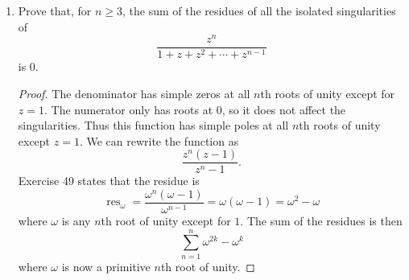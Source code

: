 \documentclass[10pt]{article}
\newcommand{\Z}{\mathbb{Z}}
\DeclareMathOperator*{\res}{res}
\begin{document}
\begin{enumerate}
\begin{proof}
Therefore, in the quotient $\dfrac{f'}{f}$, all but one copy of each pole of $f'$ is reduced to a removable singularity, and all but one copy of each zero of $f$ is reduced to a removable singularity.  Thus, the poles of $\dfrac{f'}{f}$ are all simple, and they are precisely the poles and zeros of $f$.

Now, suppose $z_0$ is a pole of $f$ of order $N$.  Then $f(z) = (z - z_0)^{-N}h(z)$ for some $h$ that is holomorphic and nonzero in a neighborhood of $z_0$.  This gives $f'(z) = -N(z-z_0)^{-N-1}h(z) + (z-z_0)^{-N}h'(z)$.  Also, $z_0$ is a simple pole of $\dfrac{f'}{f}$, so its residue is given by
\begin{align*}
\res\nolimits_{z_0} \frac{f'(z)}{f(z)} &= \lim_{z \rightarrow z_0} (z-z_0)\frac{f'(z)}{f(z)}
\\
&=
\lim_{z \rightarrow z_0} (z-z_0)\frac{-N(z-z_0)^{-N-1}h(z) + (z-z_0)^{-N}h'(z)}{(z - z_0)^{-N}h(z)}
\\
&=
\lim_{z \rightarrow z_0} \frac{-Nh(z) + (z-z_0)h'(z)}{h(z)}
\\
&=
\frac{-Nh(z_0)}{h(z_0)}
\\
&= -N \in \Z.
\end{align*}
If $z_0$ is a zero of $f$ of order $M$, then $f(z) = (z - z_0)^M h(z)$ for a function $h$ that is holomorphic and nonzero in a neighborhood of $z_0$.  Now, $f'(z) = M(z-z_0)^{M-1}h(z) + (z-z_0)^{M}h'(z)$.   Again, $z_0$ is a simple pole of $\frac{f'}{f}$.  Substituting $-N = M$ in the algebraic proof directly above, we see that the exact result still follows, and we obtain
$$
\res\nolimits_{z_0} \frac{f'(z)}{f(z)} = M \in \Z.
$$
So, in all cases, the residue is an integer.
\end{proof}

\item Prove that, for $n \geq 3$, the sum of the residues of all the isolated singularities of
$$
\frac{z^n}{1 + z + z^2 + \cdots + z^{n-1}}
$$
is 0.

\begin{proof}
The denominator has simple zeros at all $n$th roots of unity except for $z = 1$.  The numerator only has roots at $0$, so it does not affect the singularities.  Thus this function has simple poles at all $n$th roots of unity except $z = 1$.
We can rewrite the function as
$$
\frac{z^n(z-1)}{z^n - 1}.
$$
Exercise 49 states that the residue is
$$
\res\nolimits_{\omega} = \frac{\omega^n(\omega - 1)}{\omega^{n-1}} = \omega(\omega - 1) = \omega^2 - \omega
$$
where $\omega$ is any $n$th root of unity except for $1$.  The sum of the residues is then
$$
\sum_{n=1}^n \omega^{2k} - \omega^k
$$
where $\omega$ is now a primitive $n$th root of unity.


\end{proof}
\end{enumerate}
\end{document}
